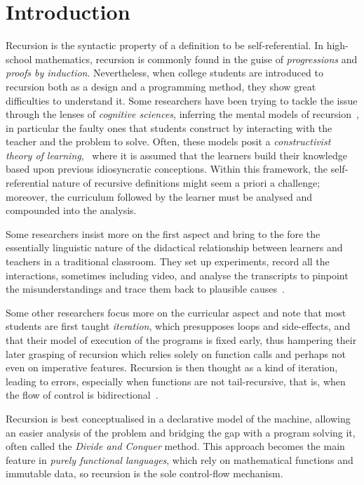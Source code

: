 
\section{Introduction}

Recursion is the syntactic property of a definition to be
self\hyp{}referential. In high\hyp{}school mathematics, recursion is
commonly found in the guise of \emph{progressions} and \emph{proofs by
  induction}. Nevertheless, when college students are introduced to
recursion both as a design and a programming method, they show great
difficulties to understand it. Some researchers have been trying to
tackle the issue through the lenses of \emph{cognitive sciences},
inferring the mental models of
recursion~\cite{SandersGalpinGotschi:2006, Mirolo:2009}, in particular
the faulty ones that students construct by interacting with the
teacher and the problem to solve. Often, these models posit a
\emph{constructivist theory of learning},~\cite{Ben-Ari:2001,
  WuDaleBethel:1998} where it is assumed that the learners build their
knowledge based upon previous idiosyncratic conceptions. Within this
framework, the self\hyp{}referential nature of recursive definitions
might seem a priori a challenge; moreover, the curriculum followed by
the learner must be analysed and compounded into the analysis.

Some researchers insist more on the first aspect and bring to the fore
the essentially linguistic nature of the didactical relationship
between learners and teachers in a traditional classroom. They set up
experiments, record all the interactions, sometimes including video,
and analyse the transcripts to pinpoint the misunderstandings and
trace them back to plausible causes~\cite{LevyLapidot:2000,
  LevyLapidotPaz:2001, LevyLapidot:2002, Levy:2001}.

Some other researchers focus more on the curricular aspect and note
that most students are first taught \emph{iteration}, which
presupposes loops and side\hyp{}effects, and that their model of
execution of the programs is fixed early, thus hampering their later
grasping of recursion which relies solely on function calls and
perhaps not even on imperative features. Recursion is then thought as
a kind of iteration, leading to errors, especially when functions are
not tail\hyp{}recursive, that is, when the flow of control is
bidirectional~\cite{Ginat:2005}. 

Recursion is best conceptualised in a declarative model of the
machine, allowing an easier analysis of the problem and bridging the
gap with a program solving it, often called the \emph{Divide and
  Conquer} method. This approach becomes the main feature in
\emph{purely functional languages}, which rely on mathematical
functions and immutable data, so recursion is the sole
control\hyp{}flow mechanism. 

